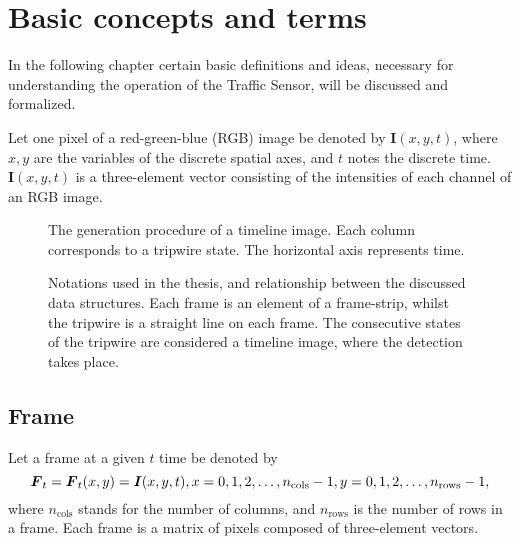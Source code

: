 \chapter{Basic concepts and terms}\label{chap:Concepts}
In the following chapter certain basic definitions and ideas, necessary for understanding the operation of the Traffic Sensor, will be discussed and formalized.

Let one pixel of a red-green-blue (RGB) image be denoted by $\boldsymbol{I}(x,y,t)$, where $x, y$ are the variables of the discrete spatial axes, and $t$ notes the discrete time.
$\boldsymbol{I}(x,y,t)$ is a three-element vector consisting of the intensities of each channel of an RGB image.
\begin{figure}[bh]
	\centering
	\scalebox{.7}{}
	\label{fig:TI_creation}
	\caption{The generation procedure of a timeline image. Each column corresponds to a tripwire state. The horizontal axis represents time.}
\end{figure}
\begin{figure}[h!]
	\centering
	\scalebox{.7}{}
	\label{fig:notations}
	\caption{Notations used in the thesis, and relationship between the discussed data structures. Each frame is an element of a frame-strip, whilst the tripwire is a straight line on each frame. The consecutive states of the tripwire are considered a timeline image, where the detection takes place.}
\end{figure}
\section{Frame}
Let a frame at a given $t$ time be denoted by
\begin{displaymath}
	\boldsymbol{F}_t=\boldsymbol{F}_t(x,y)=\boldsymbol{I}(x,y,t),\\
	x=0,1,2,\dotsc,n_{\text{cols}}-1,\\
	y=0,1,2,\dotsc,n_{\text{rows}}-1,
\end{displaymath}
where $n_{\text{cols}}$ stands for the number of columns, and $n_{\text{rows}}$ is the number of rows in a frame.
Each frame is a matrix of pixels composed of three-element vectors. 

